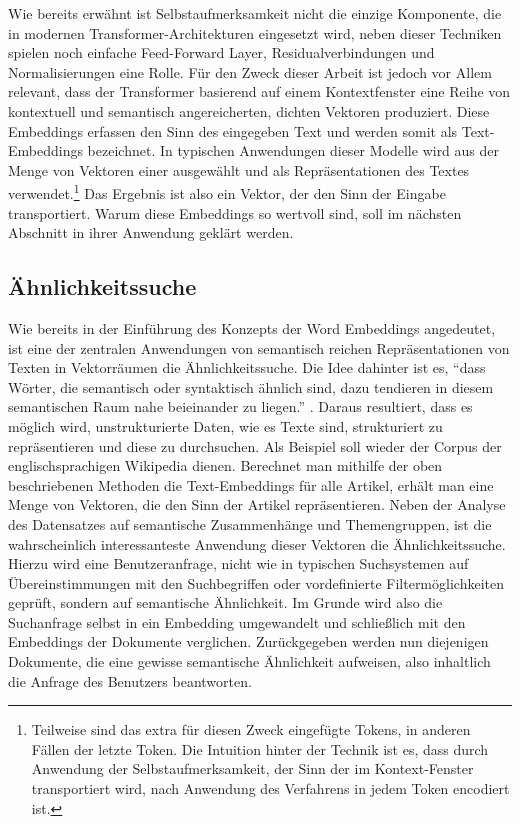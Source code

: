 Wie bereits erwähnt ist Selbstaufmerksamkeit nicht die einzige Komponente, die in modernen Transformer-Architekturen eingesetzt wird, neben dieser Techniken spielen noch einfache Feed-Forward Layer, Residualverbindungen und Normalisierungen eine Rolle. Für den Zweck dieser Arbeit ist jedoch vor Allem relevant, dass der Transformer basierend auf einem Kontextfenster eine Reihe von kontextuell und semantisch angereicherten, dichten Vektoren produziert. Diese Embeddings erfassen den Sinn des eingegeben Text und werden somit als Text-Embeddings bezeichnet. In typischen Anwendungen dieser Modelle wird aus der Menge von Vektoren einer ausgewählt und als Repräsentationen des Textes verwendet.\footnote{Teilweise sind das extra für diesen Zweck eingefügte Tokens, in anderen Fällen der letzte Token. Die Intuition hinter der Technik ist es, dass durch Anwendung der Selbstaufmerksamkeit, der Sinn der im Kontext-Fenster transportiert wird, nach Anwendung des Verfahrens in jedem Token encodiert ist. } Das Ergebnis ist also ein Vektor, der den Sinn der Eingabe transportiert. Warum diese Embeddings so wertvoll sind, soll im nächsten Abschnitt in ihrer Anwendung geklärt werden.

\subsection{Ähnlichkeitssuche}
Wie bereits in der Einführung des Konzepts der Word Embeddings angedeutet, ist eine der zentralen Anwendungen von semantisch reichen Repräsentationen von Texten in Vektorräumen die Ähnlichkeitssuche. Die Idee dahinter ist es, ``dass Wörter, die semantisch oder syntaktisch ähnlich sind, dazu tendieren in diesem semantischen Raum nahe beieinander zu liegen.'' \parencite[S. 2, Übers. d. Verf.]{semantic_search}. Daraus resultiert, dass es möglich wird, unstrukturierte Daten, wie es Texte sind, strukturiert zu repräsentieren und diese zu durchsuchen. Als Beispiel soll wieder der Corpus der englischsprachigen Wikipedia dienen. Berechnet man mithilfe der oben beschriebenen Methoden die Text-Embeddings für alle Artikel, erhält man eine Menge von Vektoren, die den Sinn der Artikel repräsentieren. Neben der Analyse des Datensatzes auf semantische Zusammenhänge und Themengruppen, ist die wahrscheinlich interessanteste Anwendung dieser Vektoren die Ähnlichkeitssuche. Hierzu wird eine Benutzeranfrage, nicht wie in typischen Suchsystemen auf Übereinstimmungen mit den Suchbegriffen oder vordefinierte Filtermöglichkeiten geprüft, sondern auf semantische Ähnlichkeit. Im Grunde wird also die Suchanfrage selbst in ein Embedding umgewandelt und schließlich mit den Embeddings der Dokumente verglichen. Zurückgegeben werden nun diejenigen Dokumente, die eine gewisse semantische Ähnlichkeit aufweisen, also inhaltlich die Anfrage des Benutzers beantworten. \\

